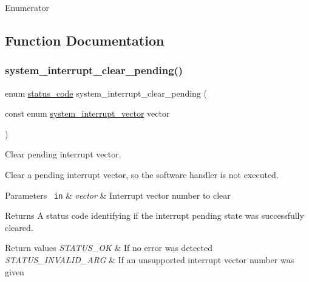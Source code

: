\begin{DoxyEnumFields}{Enumerator}
\end{DoxyEnumFields}


\subsection{Function Documentation}
\mbox{\label{group__asfdoc__sam0__system__interrupt__group_ga3c4191c58c9dda28890ec8153d8c83af}} 
\subsubsection{\texorpdfstring{system\_interrupt\_clear\_pending()}{system\_interrupt\_clear\_pending()}}
{\footnotesize\ttfamily enum \mbox{\hyperlink{group__group__sam0__utils__status__codes_ga751c892e5a46b8e7d282085a5a5bf151}{status\+\_\+code}} system\+\_\+interrupt\+\_\+clear\+\_\+pending (\begin{DoxyParamCaption}\item[{const enum \mbox{\hyperlink{group__asfdoc__sam0__system__interrupt__group_ga43378e6222cc05290c1a0c6a9ba125cf}{system\+\_\+interrupt\+\_\+vector}}}]{vector }\end{DoxyParamCaption})}



Clear pending interrupt vector. 

Clear a pending interrupt vector, so the software handler is not executed.


\begin{DoxyParams}[1]{Parameters}
\mbox{\texttt{ in}}  & {\em vector} & Interrupt vector number to clear\\
\hline
\end{DoxyParams}
\begin{DoxyReturn}{Returns}
A status code identifying if the interrupt pending state was successfully cleared.
\end{DoxyReturn}

\begin{DoxyRetVals}{Return values}
{\em S\+T\+A\+T\+U\+S\+\_\+\+OK} & If no error was detected \\
\hline
{\em S\+T\+A\+T\+U\+S\+\_\+\+I\+N\+V\+A\+L\+I\+D\+\_\+\+A\+RG} & If an unsupported interrupt vector number was given \\
\hline
\end{DoxyRetVals}
\mbox{\label{group__asfdoc__sam0__system__interrupt__group_ga586466a55934c76a69332b6819f4904a}} 
